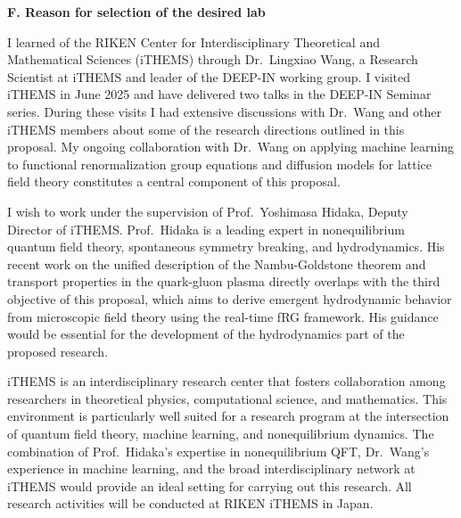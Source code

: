 \documentclass[11pt,a4paper]{article}
\begin{document}
\vspace{0.5cm}
\textbf{F. Reason for selection of the desired lab}

I learned of the RIKEN Center for Interdisciplinary Theoretical and Mathematical Sciences (iTHEMS) through Dr.~Lingxiao Wang, a Research Scientist at iTHEMS and leader of the DEEP-IN working group. I visited iTHEMS in June 2025 and have delivered two talks in the DEEP-IN Seminar series. During these visits I had extensive discussions with Dr.~Wang and other iTHEMS members about some of the research directions outlined in this proposal. My ongoing collaboration with Dr.~Wang on applying machine learning to functional renormalization group equations and diffusion models for lattice field theory constitutes a central component of this proposal.

I wish to work under the supervision of Prof.~Yoshimasa Hidaka, Deputy Director of iTHEMS. Prof.~Hidaka is a leading expert in nonequilibrium quantum field theory, spontaneous symmetry breaking, and  hydrodynamics. His recent work on the unified description of the Nambu-Goldstone theorem and transport properties in the quark-gluon plasma directly overlaps with the third objective of this proposal, which aims to derive emergent hydrodynamic behavior from microscopic field theory using the real-time fRG framework. His guidance would be essential for the development of the hydrodynamics part of the proposed research.

iTHEMS is an interdisciplinary research center that fosters collaboration among researchers in theoretical physics, computational science, and mathematics. This environment is particularly well suited for a research program at the intersection of quantum field theory, machine learning, and nonequilibrium dynamics. The combination of Prof.~Hidaka's expertise in nonequilibrium QFT, Dr.~Wang's experience in machine learning, and the broad interdisciplinary network at iTHEMS would provide an ideal setting for carrying out this research. All research activities will be conducted at RIKEN iTHEMS in Japan.


\printbibliography
\end{document}
